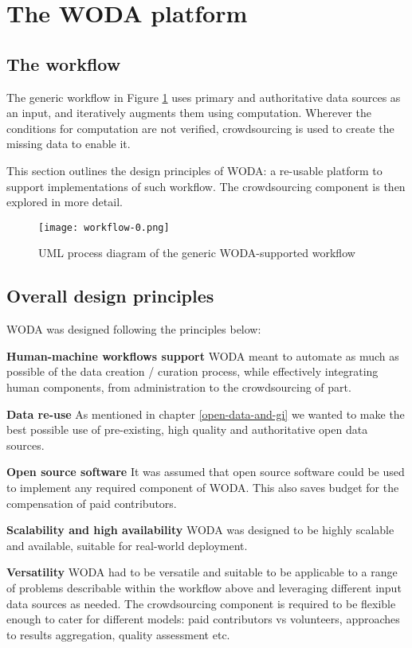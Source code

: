 \section{The WODA platform}

\subsection{The workflow}
\label{generic-workflow}

The generic workflow in Figure \ref{fig:workflow_0} uses primary and authoritative data sources as an input, and iteratively augments them using computation. Wherever the conditions for computation are not verified, crowdsourcing is used to create the missing data to enable it. 

This section outlines the design principles of WODA: a re-usable platform to support implementations of such workflow. The crowdsourcing component is then explored in more detail.

\begin{figure}
	\texttt{[image: workflow-0.png]}
	\caption{UML process diagram of the generic WODA-supported workflow}
	\label{fig:workflow_0}
\end{figure}

\subsection{Overall design principles}
\label{desing-principles}

WODA was designed following the principles below:

\textbf{Human-machine workflows support} WODA meant to automate as much as possible of the data creation / curation process, while effectively integrating human components, from administration to the crowdsourcing of part.

\textbf{Data re-use} As mentioned in chapter \ref{open-data-and-gi} we wanted to make the best possible use of pre-existing, high quality and authoritative open data sources.

\textbf{Open source software} It was assumed that open source software could be used to implement any required component of WODA. This also saves budget for the compensation of paid contributors.

\textbf{Scalability and high availability} WODA was designed to be highly scalable and available, suitable for real-world deployment.

\textbf{Versatility} WODA had to be versatile and suitable to be applicable to a range of problems describable within the workflow above and leveraging different input data sources as needed. The crowdsourcing component is required to be flexible enough to cater for different models: paid contributors vs volunteers, approaches to results aggregation, quality assessment etc.

